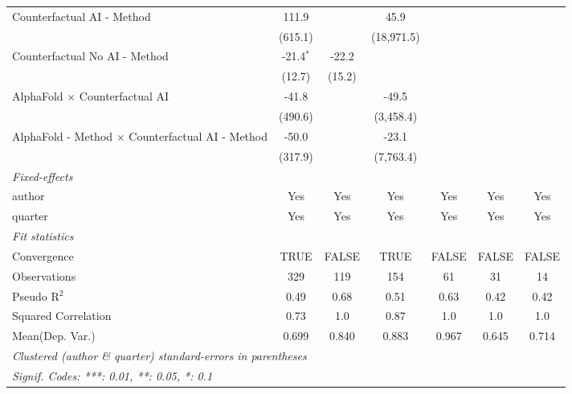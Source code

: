 \begin{tabular}{lcccccc}
   Counterfactual AI - Method                              & 111.9       &               & 45.9       &             &         &   \\   
                                                           & (615.1)     &               & (18,971.5) &             &         &   \\   
   Counterfactual No AI - Method                           & -21.4$^{*}$ & -22.2         &            &             &         &   \\   
                                                           & (12.7)      & (15.2)        &            &             &         &   \\   
   AlphaFold $\times$ Counterfactual AI                    & -41.8       &               & -49.5      &             &         &   \\   
                                                           & (490.6)     &               & (3,458.4)  &             &         &   \\   
   AlphaFold - Method $\times$ Counterfactual AI - Method  & -50.0       &               & -23.1      &             &         &   \\   
                                                           & (317.9)     &               & (7,763.4)  &             &         &   \\   
   \midrule
   \emph{Fixed-effects}\\
   author                                                  & Yes         & Yes           & Yes        & Yes         & Yes     & Yes\\  
   quarter                                                 & Yes         & Yes           & Yes        & Yes         & Yes     & Yes\\  
   \midrule
   \emph{Fit statistics}\\
   Convergence                                             &TRUE         & FALSE         & TRUE       & FALSE       & FALSE   & FALSE\\  
   Observations                                            & 329         & 119           & 154        & 61          & 31      & 14\\  
   Pseudo R$^2$                                            & 0.49        & 0.68          & 0.51       & 0.63        & 0.42    & 0.42\\  
   Squared Correlation                                     & 0.73        & 1.0           & 0.87       & 1.0         & 1.0     & 1.0\\  
Mean(Dep. Var.) & 0.699 & 0.840 & 0.883 & 0.967 & 0.645 & 0.714 \\
   \midrule \midrule
   \multicolumn{7}{l}{\emph{Clustered (author \& quarter) standard-errors in parentheses}}\\
   \multicolumn{7}{l}{\emph{Signif. Codes: ***: 0.01, **: 0.05, *: 0.1}}\\
\end{tabular}
\par\endgroup
